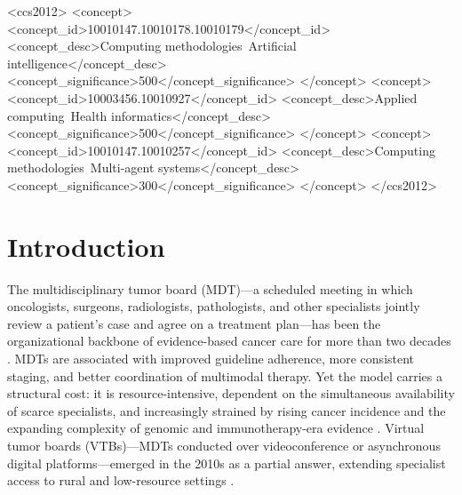 \documentclass[acmsmall,screen=true,review=false,nonacm=true]{acmart}
\begin{document}
\begin{CCSXML}
<ccs2012>
 <concept>
  <concept_id>10010147.10010178.10010179</concept_id>
  <concept_desc>Computing methodologies~Artificial intelligence</concept_desc>
  <concept_significance>500</concept_significance>
 </concept>
 <concept>
  <concept_id>10003456.10010927</concept_id>
  <concept_desc>Applied computing~Health informatics</concept_desc>
  <concept_significance>500</concept_significance>
 </concept>
 <concept>
  <concept_id>10010147.10010257</concept_id>
  <concept_desc>Computing methodologies~Multi-agent systems</concept_desc>
  <concept_significance>300</concept_significance>
 </concept>
</ccs2012>
\end{CCSXML}



\maketitle

\section{Introduction}
\label{sec:introduction}

The multidisciplinary tumor board (MDT)---a scheduled meeting in which oncologists, surgeons, radiologists, pathologists, and other specialists jointly review a patient's case and agree on a treatment plan---has been the organizational backbone of evidence-based cancer care for more than two decades \citep{patkar2011}. MDTs are associated with improved guideline adherence, more consistent staging, and better coordination of multimodal therapy. Yet the model carries a structural cost: it is resource-intensive, dependent on the simultaneous availability of scarce specialists, and increasingly strained by rising cancer incidence and the expanding complexity of genomic and immunotherapy-era evidence \citep{liu2026,wu2026}. Virtual tumor boards (VTBs)---MDTs conducted over videoconference or asynchronous digital platforms---emerged in the 2010s as a partial answer, extending specialist access to rural and low-resource settings \citep{marshall2014,thiagarajan2023}.
\end{document}
